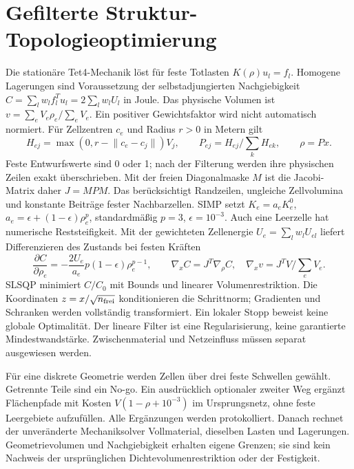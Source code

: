 \chapter{Gefilterte Struktur-Topologieoptimierung}\label{theory:topology}
Die stationäre Tet4-Mechanik löst für feste Totlasten \(K(\rho)u_l=f_l\).
Homogene Lagerungen sind Voraussetzung der selbstadjungierten
Nachgiebigkeit \(C=\sum_l w_l f_l^T u_l=2\sum_l w_l U_l\) in Joule.
Das physische Volumen ist \(v=\sum_e V_e\rho_e/\sum_e V_e\).
Ein positiver Gewichtsfaktor wird nicht automatisch normiert.
Für Zellzentren \(c_e\) und Radius \(r>0\) in Metern gilt
\[
 H_{ej}=\max(0,r-\lVert c_e-c_j\rVert)V_j,\qquad
 P_{ej}=H_{ej}/\sum_k H_{ek},\qquad \rho=Px.
\]
Feste Entwurfswerte sind 0 oder 1; nach der Filterung werden ihre physischen
Zeilen exakt überschrieben. Mit der freien Diagonalmaske \(M\) ist die
Jacobi-Matrix daher \(J=MPM\). Das berücksichtigt Randzeilen,
ungleiche Zellvolumina und konstante Beiträge fester Nachbarzellen.
SIMP setzt \(K_e=a_e K_e^0\),
\(a_e=\epsilon+(1-\epsilon)\rho_e^p\), standardmäßig \(p=3\),
\(\epsilon=10^{-3}\). Auch eine Leerzelle hat numerische Reststeifigkeit.
Mit der gewichteten Zellenergie \(U_e=\sum_l w_l U_{el}\) liefert
Differenzieren des Zustands bei festen Kräften
\[
 \frac{\partial C}{\partial\rho_e}
 =-\frac{2U_e}{a_e}p(1-\epsilon)\rho_e^{p-1},\qquad
 \nabla_x C=J^T\nabla_\rho C,\quad
 \nabla_x v=J^TV/\sum_e V_e.
\]
SLSQP minimiert \(C/C_0\) mit Bounds und linearer Volumenrestriktion.
Die Koordinaten \(z=x/\sqrt{n_{\rm frei}}\) konditionieren die Schrittnorm;
Gradienten und Schranken werden vollständig transformiert. Ein lokaler Stopp
beweist keine globale Optimalität. Der lineare Filter ist eine Regularisierung,
keine garantierte Mindestwandstärke. Zwischenmaterial und Netzeinfluss müssen
separat ausgewiesen werden.

Für eine diskrete Geometrie werden Zellen über drei feste Schwellen gewählt.
Getrennte Teile sind ein No-go. Ein ausdrücklich optionaler zweiter Weg ergänzt
Flächenpfade mit Kosten \(V(1-\rho+10^{-3})\) im Ursprungsnetz, ohne feste
Leergebiete aufzufüllen. Alle Ergänzungen werden protokolliert. Danach rechnet
der unveränderte Mechaniksolver Vollmaterial, dieselben Lasten und Lagerungen.
Geometrievolumen und Nachgiebigkeit erhalten eigene Grenzen; sie sind kein
Nachweis der ursprünglichen Dichtevolumenrestriktion oder der Festigkeit.
